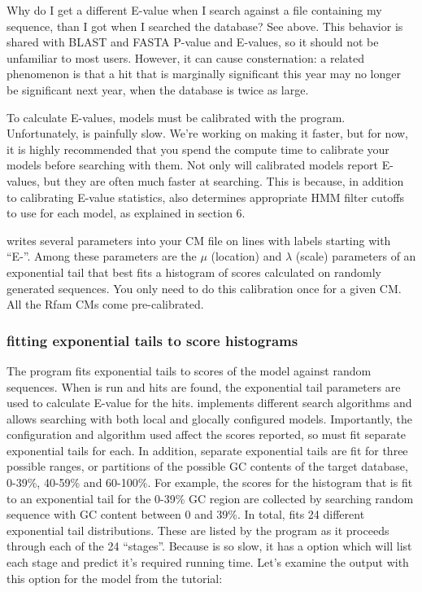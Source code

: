 \begin{srefaq}{Why do I get a different E-value when I search
against a file containing my sequence, than I got when I searched the
database?} See above. This behavior is shared with BLAST and FASTA
P-value and E-values, so it should not be unfamiliar to most users.
However, it can cause consternation: a related phenomenon is that a
hit that is marginally significant this year may no longer be
significant next year, when the database is twice as large. 
\end{srefaq}

To calculate E-values, models must be calibrated with the
 program. Unfortunately,  is
painfully slow. We're working on making it faster, but for now, it is
highly recommended that you spend the compute time to calibrate your
models before searching with them. Not only will calibrated models
report E-values, but they are often much faster at searching. This is
because, in addition to calibrating E-value statistics, 
also determines appropriate HMM filter cutoffs to use for each model, as
explained in section 6.

 writes several parameters into your CM file on
lines with labels starting with ``E-''. Among these parameters are the
$\mu$ (location) and $\lambda$ (scale) parameters of an exponential
tail that best fits a histogram of scores calculated on randomly
generated sequences. You only need to do this calibration once
for a given CM. All the Rfam CMs come pre-calibrated.

\subsubsection{fitting exponential tails to  score histograms}

The  program fits exponential tails to scores of the
model against random sequences. When  is run and hits
are found, the exponential tail parameters are used to calculate
E-value for the hits.  implements different search
algorithms and allows searching with both local and glocally
configured models. Importantly, the configuration and algorithm used
affect the scores reported, so  must fit separate
exponential tails for each.  In addition, separate
exponential tails are fit for three possible ranges, or partitions of
the possible GC contents of the target database, 0-39\%, 40-59\% and
60-100\%.  For example, the scores for the histogram that is fit to an
exponential tail for the 0-39\% GC region are collected by searching
random sequence with GC content between 0 and 39\%. In total,
 fits 24 different exponential tail
distributions. These are listed by the program as it proceeds through
each of the 24 ``stages''.  Because  is so slow, it
has a  option which will list each stage and predict
it's required running time. Let's examine the output with this option
for the  model from the tutorial:

